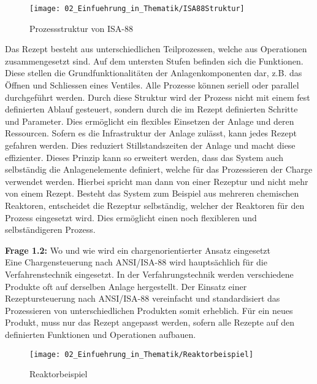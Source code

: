 		\begin{figure}[h!]
			\centering
			\texttt{[image: 02\_Einfuehrung\_in\_Thematik/ISA88Struktur]}
			\captionsetup{justification=centering}
			\caption{Prozessstruktur von ISA-88}
			\label{fig:Prozessstruktur_ISA88}
		\end{figure}
		
		Das Rezept besteht aus unterschiedlichen Teilprozessen, welche aus Operationen zusammengesetzt sind. Auf dem untersten Stufen befinden sich die Funktionen. Diese stellen die Grundfunktionalitäten der Anlagenkomponenten dar, z.B. das Öffnen und Schliessen eines Ventiles. Alle Prozesse können seriell oder parallel durchgeführt werden. Durch diese Struktur wird der Prozess nicht mit einem fest definierten Ablauf gesteuert, sondern durch die im Rezept definierten Schritte und Parameter. Dies ermöglicht ein flexibles Einsetzen der Anlage und deren Ressourcen. Sofern es die Infrastruktur der Anlage zulässt, kann jedes Rezept gefahren werden. Dies reduziert Stillstandszeiten der Anlage und macht diese effizienter. Dieses Prinzip kann so erweitert werden, dass das System auch selbständig die Anlagenelemente definiert, welche für das Prozessieren der Charge verwendet werden. Hierbei spricht man dann von einer Rezeptur und nicht mehr von einem Rezept. Besteht das System zum Beispiel aus mehreren chemischen Reaktoren, entscheidet die Rezeptur selbständig, welcher der Reaktoren für den Prozess eingesetzt wird. Dies ermöglicht einen noch flexibleren und selbständigeren Prozess.
		
	\vspace{3mm}
	
	\textbf{Frage 1.2:} Wo und wie wird ein chargenorientierter Ansatz eingesetzt \vspace{2mm} 
	\\
		Eine Chargensteuerung nach ANSI/ISA-88 wird hauptsächlich für die Verfahrenstechnik eingesetzt. In der Verfahrungstechnik werden verschiedene Produkte oft auf derselben Anlage hergestellt. Der Einsatz einer Rezeptursteuerung nach ANSI/ISA-88 vereinfacht und standardisiert das Prozessieren von unterschiedlichen Produkten somit erheblich. Für ein neues Produkt, muss nur das Rezept angepasst werden, sofern alle Rezepte auf den definierten Funktionen und Operationen aufbauen. 
		
		\begin{figure}[h!]
			\centering
			\texttt{[image: 02\_Einfuehrung\_in\_Thematik/Reaktorbeispiel]}
			\captionsetup{justification=centering}
			\caption{Reaktorbeispiel}
			\label{fig:Reaktorbeispiel}
		\end{figure}
		
